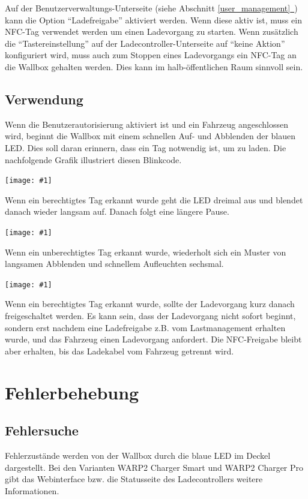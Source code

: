 \documentclass[a4paper,10pt]{article}
\newcommand{\gfx}[1]{\texttt{[image: \#1]}}
\newcommand*{\fullref}[1]{Abschnitt \hyperref[{#1}]{\ref*{#1}~\nameref*{#1}}}
\begin{document}
\begin{multicols*}{2}
    Auf der Benutzerverwaltungs-Unterseite (siehe \fullref{user_management}) kann die Option \enquote{Ladefreigabe} aktiviert werden.
    Wenn diese aktiv ist, muss ein NFC-Tag verwendet werden um einen Ladevorgang zu starten.
    Wenn zusätzlich die \enquote{Tastereinstellung} auf der Ladecontroller-Unterseite auf \enquote{keine Aktion} konfiguriert wird,
    muss auch zum Stoppen eines Ladevorgangs ein NFC-Tag an die Wallbox gehalten werden. Dies kann im
    halb-öffentlichen Raum sinnvoll sein.

    \subsection{Verwendung}
    Wenn die Benutzerautorisierung aktiviert ist und ein Fahrzeug angeschlossen wird,
    beginnt die Wallbox mit einem schnellen Auf- und Abblenden der blauen LED.
    Dies soll daran erinnern, dass ein Tag notwendig ist, um zu laden. Die
    nachfolgende Grafik illustriert diesen Blinkcode.

    \gfx{./img_warp2/resized/blink_nag}

    Wenn ein berechtigtes Tag erkannt wurde geht die LED
    dreimal aus und blendet danach wieder langsam auf. Danach folgt eine längere Pause.

    \gfx{./img_warp2/resized/blink_ack}

    Wenn ein unberechtigtes Tag erkannt wurde, wiederholt sich ein Muster von langsamen Abblenden
    und schnellem Aufleuchten sechsmal.

    \gfx{./img_warp2/resized/blink_nack}

    Wenn ein berechtigtes Tag erkannt wurde, sollte der Ladevorgang kurz danach
    freigeschaltet werden. Es kann sein, dass der Ladevorgang nicht
    sofort beginnt, sondern erst nachdem eine Ladefreigabe z.B. vom Lastmanagement erhalten wurde,
    und das Fahrzeug einen Ladevorgang anfordert. Die NFC-Freigabe bleibt aber erhalten,
    bis das Ladekabel vom Fahrzeug getrennt wird.

    \newpage \section{Fehlerbehebung}\label{fehlerbehebung} \subsection{Fehlersuche}
    Fehlerzustände werden von der Wallbox durch die blaue LED im Deckel
    dargestellt. Bei den Varianten WARP2 Charger Smart und WARP2 Charger Pro
    gibt das Webinterface bzw. die Statusseite des Ladecontrollers
    weitere Informationen.


\end{multicols*}
\end{document}
